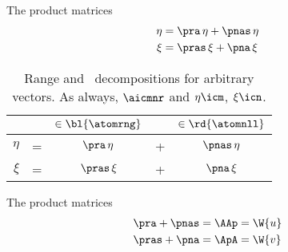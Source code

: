 The product matrices
\begin{equation}
  \begin{split}
    \eta &= \pra  \, \eta + \pnas \, \eta \\
    \xi  &= \pras \, \xi  + \pna  \, \xi 
  \end{split}
\end{equation}
\begin{table}[htdp]
\caption[Range and \ns \ decompositions for arbitrary vectors]{Range and \ns \ decompositions for arbitrary vectors. As always, $\aicmnr$ and $\eta\icm$, $\xi\icn$.}
\begin{center}
\begin{tabular}{rcccc}
%
   && $\in{\bl{ \atomrng }}$ && $\in{\rd{ \atomnll }}$ \\\hline
%
  $\eta$ &=& $\pra  \, \eta$ &+& $\pnas \, \eta$ \\
%
  $\xi$  &=& $\pras \, \xi$  &+& $\pna  \, \xi$
%
\end{tabular}
\end{center}
\label{tab:projectors:range and null spaces}
\end{table}
The product matrices
\begin{equation}
  \begin{split}
    \pra  + \pnas = \AAp &= \W{u} \\
    \pras + \pna  = \ApA &= \W{v} 
  \end{split}
\end{equation}



\endinput